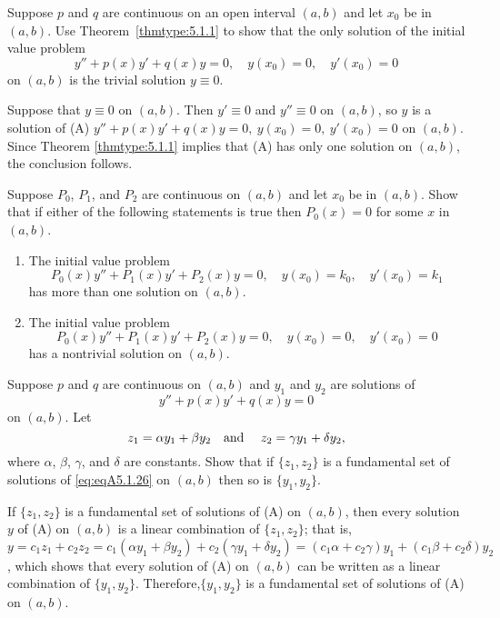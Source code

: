 \documentclass{ximera}
\begin{document}
\begin{problem}\label{exer:5.1.24}
 Suppose  $p$ and $q$ are continuous on an open interval $(a,b)$
and let $x_0$ be in $(a,b)$.
Use   Theorem~\ref{thmtype:5.1.1} to show that
 the only solution of the initial value problem
$$
y''+p(x)y'+q(x)y=0,\quad  y(x_0)=0,\quad y'(x_0)=0
$$
on  $(a,b)$ is the trivial solution $y\equiv0$.

\begin{solution}
    Suppose that $y\equiv0$ on $(a,b)$. Then $y'\equiv0$ and $y''\equiv0$
on $(a,b)$, so $y$ is a solution of (A) $y''+p(x)y'+q(x)y=0,\
y(x_0)=0,\ y'(x_0)=0$ on $(a,b)$. Since Theorem \ref{thmtype:5.1.1}
implies that (A) has only one solution on $(a,b)$, the conclusion
follows.
\end{solution}
\end{problem}

\begin{problem}\label{exer:5.1.25}
Suppose $P_0$, $P_1$, and $P_2$ are continuous on  $(a,b)$
and let $x_0$ be in  $(a,b)$. Show that if either of
the following statements is true then $P_0(x)=0$ for some $x$ in
$(a,b)$.
\begin{enumerate}
\item %
The initial value problem
$$
P_0(x)y''+P_1(x)y'+P_2(x)y=0,\quad  y(x_0)=k_0,\quad y'(x_0)=k_1
$$
has more than one  solution on  $(a,b)$.
\item %
The initial value problem
$$
P_0(x)y''+P_1(x)y'+P_2(x)y=0,\quad y(x_0)=0,\quad y'(x_0)=0
$$
has a nontrivial solution on  $(a,b)$.
\end{enumerate}
\end{problem}

\begin{problem}\label{exer:5.1.26}
Suppose  $p$ and $q$ are continuous  on  $(a,b)$ and
 $y_1$ and $y_2$ are solutions of
\begin{equation}\label{eq:eqA5.1.26}
y''+p(x)y'+q(x)y=0
\end{equation}
on  $(a,b)$. Let
$$
z_1=\alpha y_1+\beta y_2\mbox{\quad  and \quad} z_2=\gamma y_1+\delta
y_2,
$$
where $\alpha$, $\beta$, $\gamma$, and $\delta$ are constants.
Show that if  $\{z_1,z_2\}$
is a fundamental set of solutions of
\ref{eq:eqA5.1.26} on $(a,b)$ then so is  $\{y_1,y_2\}$.

\begin{solution}
    If $\{z_1,z_2\}$ is a fundamental set of solutions of
(A) on $(a,b)$, then every solution $y$ of
(A) on $(a,b)$ is a linear combination of
$\{z_1,z_2\}$; that is, $y=c_1z_1+c_2z_2=c_1(\alpha y_1+\beta
y_2)+c_2(\gamma y_1+\delta y_2)
=(c_1\alpha+c_2\gamma)y_1+(c_1\beta+c_2\delta)y_2$, which shows that
every solution of (A) on $(a,b)$ can be written as
a linear combination of $\{y_1,y_2\}$. Therefore,$\{y_1,y_2\}$ is a
fundamental set of solutions of (A) on $(a,b)$.
\end{solution}
\end{problem}
\end{document}
